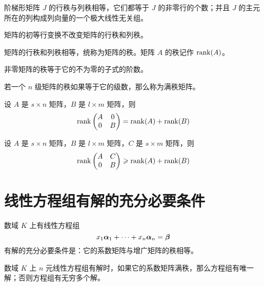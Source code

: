 \begin{theorem}
	阶梯形矩阵 $J$ 的行秩与列秩相等，它们都等于 $J$ 的非零行的个数；并且 $J$ 的主元所在的列构成列向量的一个极大线性无关组。
\end{theorem}

\begin{theorem}
	矩阵的初等行变换不改变矩阵的行秩和列秩。
\end{theorem}

\begin{theorem}
	矩阵的行秩和列秩相等，统称为矩阵的秩。矩阵 $A$ 的秩记作 $\operatorname{rank}(A)$。
\end{theorem}

\begin{theorem}
	非零矩阵的秩等于它的不为零的子式的阶数。
\end{theorem}

若一个 $n$ 级矩阵的秩如果等于它的级数，那么称为满秩矩阵。

\begin{theorem}
	设 $A$ 是 $s \times n$ 矩阵，$B$ 是 $l \times m$ 矩阵，则
	\[ \operatorname{rank}\left(\begin{matrix}
				A & 0 \\ 0  & B
			\end{matrix}\right) = \operatorname{rank}(A) + \operatorname{rank}(B) \]
\end{theorem}

\begin{theorem}
	设 $A$ 是 $s \times n$ 矩阵，$B$ 是 $l \times m$ 矩阵，$C$ 是 $s \times m$ 矩阵，则
	\[ \operatorname{rank}\left(\begin{matrix}
				A & C \\ 0  & B
			\end{matrix}\right) \geqslant \operatorname{rank}(A) + \operatorname{rank}(B) \]
\end{theorem}

\section{线性方程组有解的充分必要条件}

\begin{theorem}
	数域 $K$ 上有线性方程组
	\[x_1\boldsymbol{\alpha}_1 + \cdots + x_n\boldsymbol{\alpha}_n = \boldsymbol{\beta}\]
	有解的充分必要条件是：它的系数矩阵与增广矩阵的秩相等。
\end{theorem}

\begin{theorem}
	数域 $K$ 上 $n$ 元线性方程组有解时，如果它的系数矩阵满秩，那么方程组有唯一解；否则方程组有无穷多个解。
\end{theorem}

